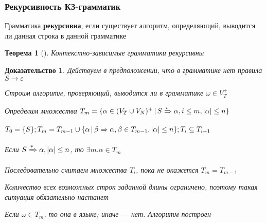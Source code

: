 \documentclass{beamer}
\newtheorem{rutheorem}{Теорема}
\newtheorem{ruproof}{Доказательство}
\newcommand{\derive}[0]{\xRightarrow[]{*}}
\newcommand{\derives}[0]{\xRightarrow[]{}}
\newcommand{\derivek}[1]{\xRightarrow[]{#1}}
\begin{document}
\begin{frame}[fragile]
  \transwipe[direction=90]
  \frametitle{Рекурсивность КЗ-грамматик}

\begin{center}
    Грамматика \textbf{рекурсивна}, если существует алгоритм, определяющий, выводится ли данная строка в данной грамматике
\end{center}
  
  \begin{rutheorem}[]
  Контекстно-зависимые грамматики рекурсивны
  \end{rutheorem}
  
  \begin{ruproof}
  Действуем в предположении, что в грамматике нет правила $S \rightarrow \varepsilon$
  
  Строим алгоритм, проверяющий, выводится ли в грамматике $\omega \in V_T^+$
  
  Определим множества $T_m = \{ \alpha \in (V_T \cup V_N)^+\, | \, S \derivek{i} \alpha, i \leq m, | \alpha | \leq n \}$
  
  $T_0 =\{ S \}; T_m = T_{m-1} \cup \{ \alpha \, | \, \beta \derives \alpha, \beta \in T_{m-1}, | \alpha | \leq n \}; T_i \subseteq T_{i+1}$ 
  
  Если $S \derive \alpha, | \alpha | \leq n $, то $\exists m. \alpha \in T_m$
  
  Последовательно считаем множества $T_i$, пока не окажется $T_m = T_{m-1}$
  
  Количество всех возможных строк заданной длины ограничено, поэтому такая ситуация обязательно настанет
  
  Если $\omega \in T_m$, то она в языке; иначе --- нет. Алгоритм построен
  \end{ruproof}
  
\end{frame}
\end{document}
